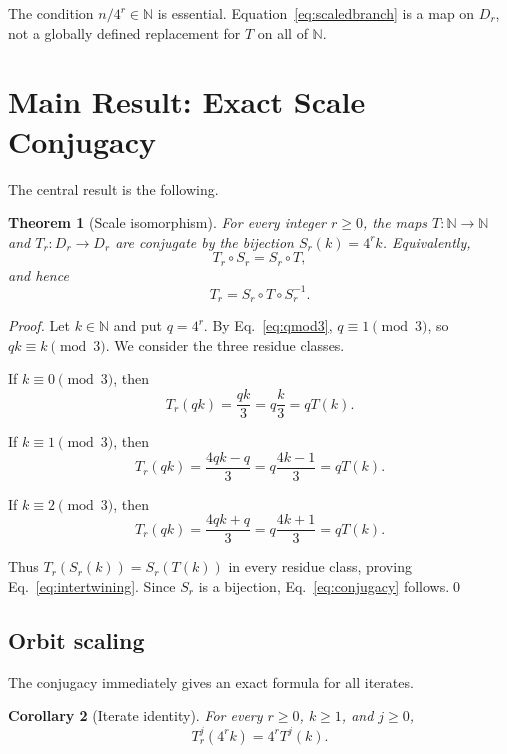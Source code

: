 \documentclass[11pt]{article}
\newtheorem{theorem}{Theorem}[section]
\newtheorem{corollary}[theorem]{Corollary}
\newcommand{\N}{\mathbb{N}}
\begin{document}
The condition $n/4^r\in\N$ is essential. Equation~\eqref{eq:scaledbranch} is a map on $D_r$, not a globally defined replacement for $T$ on all of $\N$.

\section{Main Result: Exact Scale Conjugacy}
The central result is the following.

\begin{theorem}[Scale isomorphism]
For every integer $r\ge0$, the maps $T:\N\to\N$ and $T_r:D_r\to D_r$ are conjugate by the bijection $S_r(k)=4^rk$. Equivalently,
\begin{equation}
T_r\circ S_r=S_r\circ T,
\label{eq:intertwining}
\end{equation}
and hence
\begin{equation}
T_r=S_r\circ T\circ S_r^{-1}.
\label{eq:conjugacy}
\end{equation}
\end{theorem}

\begin{proof}
Let $k\in\N$ and put $q=4^r$. By Eq.~\eqref{eq:qmod3}, $q\equiv1\pmod3$, so $qk\equiv k\pmod3$. We consider the three residue classes.

If $k\equiv0\pmod3$, then
\[
T_r(qk)=\frac{qk}{3}=q\frac{k}{3}=qT(k).
\]

If $k\equiv1\pmod3$, then
\[
T_r(qk)=\frac{4qk-q}{3}
=q\frac{4k-1}{3}=qT(k).
\]

If $k\equiv2\pmod3$, then
\[
T_r(qk)=\frac{4qk+q}{3}
=q\frac{4k+1}{3}=qT(k).
\]

Thus $T_r(S_r(k))=S_r(T(k))$ in every residue class, proving Eq.~\eqref{eq:intertwining}. Since $S_r$ is a bijection, Eq.~\eqref{eq:conjugacy} follows.\qed
\end{proof}

\subsection{Orbit scaling}
The conjugacy immediately gives an exact formula for all iterates.

\begin{corollary}[Iterate identity]
For every $r\ge0$, $k\ge1$, and $j\ge0$,
\begin{equation}
T_r^j(4^rk)=4^rT^j(k).
\label{eq:iterate}
\end{equation}
\end{corollary}
\end{document}
